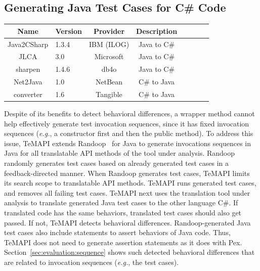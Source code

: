 \subsection{Generating Java Test Cases for C\# Code}

\label{sec:approach:sequence}
\begin{table}[t]
\centering
\begin{SmallOut}
\begin {tabular} {|c|l|c|c|c|c|c|c|}
\hline
\textbf{Name}& \textbf{Version}& \textbf{Provider} &\textbf{Description}\\
\hline
Java2CSharp  &  1.3.4 & IBM (ILOG) & Java to C\# \\
\hline
JLCA         &  3.0   & Microsoft  & Java to C\# \\
\hline
sharpen      &  1.4.6 & db4o       & Java to C\# \\
\hline
Net2Java     &  1.0   & NetBean    &  C\# to Java\\
\hline
converter    &  1.6   & Tangible   &  C\# to Java\\
\hline
\end{tabular}\vspace*{-2ex}
 \label{table:subjects}
\end{SmallOut}\vspace*{-4ex}
\end{table}

Despite of its benefits to detect behavioral differences, a wrapper method cannot help effectively generate test invocation sequences, since it has fixed invocation sequences (\emph{e.g.}, a constructor first and then the public method). To address this issue, TeMAPI extends Randoop~\cite{pacheco2007feedback} for Java to generate invocations sequences in Java for all translatable API methods of the tool under analysis. Randoop randomly generates test cases based on already generated test cases in a feedback-directed manner. When Randoop generates test cases, TeMAPI limits its search scope to translatable API methods.
TeMAPI runs generated test cases, and removes all failing test cases. TeMAPI next uses the translation tool under analysis to translate generated Java test cases to the other language C\#. If translated code has the same behaviors, translated test cases should also get passed. If not, TeMAPI detects behavioral differences. Randoop-generated Java test cases also include  statements to assert behaviors of Java code. Thus, TeMAPI does not need to generate assertion statements as it does with Pex. Section~\ref{sec:evaluation:sequence} shows such detected behavioral differences that are related to invocation sequences (\emph{e.g.}, the  test cases). 

